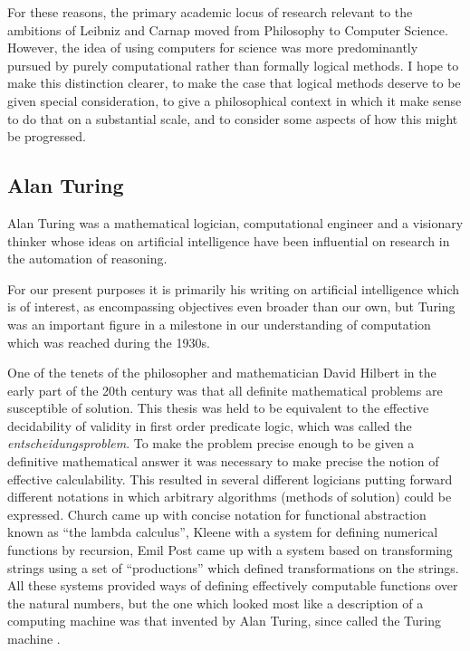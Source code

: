 For these reasons, the primary academic locus of research relevant to the
ambitions of Leibniz and Carnap moved from Philosophy to Computer
Science.
However, the idea of using computers for science was more
predominantly pursued by purely computational rather than formally
logical methods.
I hope to make this distinction clearer, to make the case that
logical methods deserve to be given special consideration, to give a
philosophical context in which it make sense to do that on a
substantial scale, and to consider some aspects of how this might be progressed.

\subsection{Alan Turing}

Alan Turing was a mathematical logician, computational engineer and a
visionary thinker whose ideas on artificial intelligence have been
influential on research in the automation of reasoning.

For our present purposes it is primarily his writing on artificial
intelligence which is of interest, as encompassing objectives even
broader than our own, but Turing was an important figure in a
milestone in our understanding of computation which was reached during
the 1930s.

One of the tenets of the philosopher and mathematician David Hilbert
in the early part of the 20th century was that all definite
mathematical problems are susceptible of solution.
This thesis was held to be equivalent to the effective decidability of
validity in first order predicate logic, which was called the \emph{entscheidungsproblem}.
To make the problem precise enough to be given a definitive
mathematical answer it was necessary to make precise the notion of effective calculability.
This resulted in several different logicians putting forward different
notations in which arbitrary algorithms (methods of solution) could be
expressed.
Church came up with concise notation for functional abstraction known
as ``the lambda calculus'', Kleene with a system for defining
numerical functions by recursion, Emil Post came up with a system
based on transforming strings using a set of ``productions'' which
defined transformations on the strings.
All these systems provided ways of defining effectively computable
functions over the natural numbers, but the one which looked most like
a description of a computing machine was that invented by Alan Turing,
since called the Turing machine \cite{turingOCN}.

